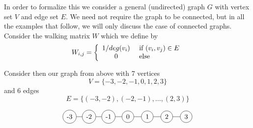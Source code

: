 \documentclass{article}
\theoremstyle{definition}
\theoremstyle{remark}
\numberwithin{equation}{section}
\begin{document}
In order to formalize this we consider a general (undirected) graph $G$ with vertex set $V$ and edge set $E$.  We need not require the graph to be connected, but in all the examples that follow, we will only discuss the case of connected graphs.  Consider the walking matrix $W$ which we define by
\begin{equation}
W_{i,j} = \left\{ \begin{array}{c l}
1/deg(v_i) & \textrm{ if } (v_i,v_j)\in E\\ 
0 & \textrm{ else }
\end{array}
\right.
\end{equation}

Consider then our graph from above with 7 vertices 
\[
V = \{-3,-2,-1,0,1,2,3\}
\] and 6 edges 
\[
E = \{(-3,-2),(-2,-1),\dots,(2,3) \}
\]

\[
\begin{tikzpicture}
\node[circle,draw](-3) at (0,0){-3};
\node[circle,draw](-2) at (1,0){-2};
\node[circle,draw](-1) at (2,0){-1};
\node[circle,draw](0) at (3,0){0};
\node[circle,draw](1) at (4,0){1};
\node[circle,draw](2) at (5,0){2};
\node[circle,draw](3) at (6,0){3};
\foreach \from/\to in {-3/-2,-2/-1,-1/0,0/1,1/2,2/3}
 \draw (\from) -- (\to);
\end{tikzpicture}
\]
\end{document}
